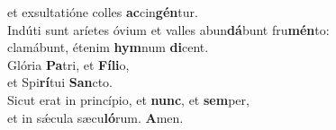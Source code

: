 \oddverse et exsultatióne colles \textbf{ac}cin\textbf{gén}tur.\\
\evenverse Indúti sunt aríetes óvium et valles abun\textbf{dá}bunt fru\textbf{mén}to:~\*\\
\evenverse clamábunt, étenim \textbf{hym}num \textbf{di}cent.\\
\oddverse Glória \textbf{Pa}tri, et \textbf{Fí}\textbf{li}o,~\*\\
\oddverse et Spi\textbf{rí}tui \textbf{San}cto.\\
\evenverse Sicut erat in princípio, et \textbf{nunc}, et \textbf{sem}per,~\*\\
\evenverse et in sǽcula sæcu\textbf{ló}rum. \textbf{A}men.\\
